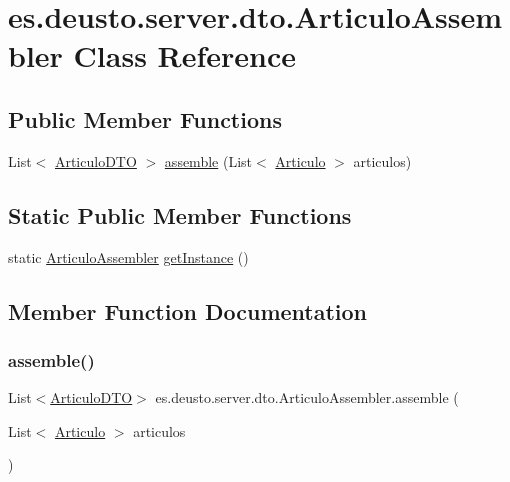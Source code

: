 \hypertarget{classes_1_1deusto_1_1server_1_1dto_1_1_articulo_assembler}{}\section{es.\+deusto.\+server.\+dto.\+Articulo\+Assembler Class Reference}
\label{classes_1_1deusto_1_1server_1_1dto_1_1_articulo_assembler}
\subsection*{Public Member Functions}
\begin{DoxyCompactItemize}
\item 
List$<$ \mbox{\hyperlink{classes_1_1deusto_1_1server_1_1dto_1_1_articulo_d_t_o}{Articulo\+D\+TO}} $>$ \mbox{\hyperlink{classes_1_1deusto_1_1server_1_1dto_1_1_articulo_assembler_af2594684f9946fb999618bcccd58f9f1}{assemble}} (List$<$ \mbox{\hyperlink{classes_1_1deusto_1_1client_1_1data_1_1_articulo}{Articulo}} $>$ articulos)
\end{DoxyCompactItemize}
\subsection*{Static Public Member Functions}
\begin{DoxyCompactItemize}
\item 
static \mbox{\hyperlink{classes_1_1deusto_1_1server_1_1dto_1_1_articulo_assembler}{Articulo\+Assembler}} \mbox{\hyperlink{classes_1_1deusto_1_1server_1_1dto_1_1_articulo_assembler_a5c5874d4651ceab1ae0feb08ceeaadad}{get\+Instance}} ()
\end{DoxyCompactItemize}


\subsection{Member Function Documentation}
\mbox{\label{classes_1_1deusto_1_1server_1_1dto_1_1_articulo_assembler_af2594684f9946fb999618bcccd58f9f1}} 
\subsubsection{\texorpdfstring{assemble()}{assemble()}}
{\footnotesize\ttfamily List$<$\mbox{\hyperlink{classes_1_1deusto_1_1server_1_1dto_1_1_articulo_d_t_o}{Articulo\+D\+TO}}$>$ es.\+deusto.\+server.\+dto.\+Articulo\+Assembler.\+assemble (\begin{DoxyParamCaption}\item[{List$<$ \mbox{\hyperlink{classes_1_1deusto_1_1client_1_1data_1_1_articulo}{Articulo}} $>$}]{articulos }\end{DoxyParamCaption})}

